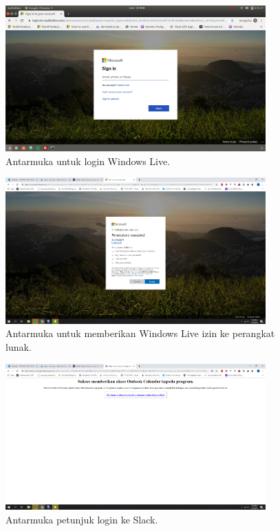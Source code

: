 \begin{figure}[h]
  \includegraphics[width=10cm]{./Gambar/Step2.png}
  \centering
  \caption{Antarmuka untuk login Windows Live.}
  \label{fig:login_win_live}
\end{figure}

\begin{figure}[h]
  \includegraphics[width=10cm]{./Gambar/Step3.png}
  \centering
  \caption{Antarmuka untuk memberikan Windows Live izin ke perangkat lunak.}
  \label{fig:izin_win_live}
\end{figure}

\begin{figure}[h]
  \includegraphics[width=10cm]{./Gambar/Step4.png}
  \centering
  \caption{Antarmuka petunjuk login ke Slack.}
  \label{fig:petunjuk_login_slack}
\end{figure}

